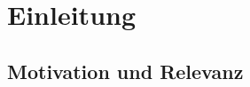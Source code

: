 

%

\chapter{Einleitung}
\label{cap:Einleitung}

\section{Motivation und Relevanz}
\label{sec:Motivation}

